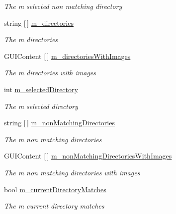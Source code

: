 \begin{DoxyCompactItemize}
\begin{DoxyCompactList}\small\item\em The m selected non matching directory \end{DoxyCompactList}\item 
string \mbox{[}$\,$\mbox{]} \hyperlink{class_lerp2_a_p_i_editor_1_1_utility_1_1_file_browser_editor_a5112a37291c548fa86b7d014d2ac63b5}{m\+\_\+directories}
\begin{DoxyCompactList}\small\item\em The m directories \end{DoxyCompactList}\item 
G\+U\+I\+Content \mbox{[}$\,$\mbox{]} \hyperlink{class_lerp2_a_p_i_editor_1_1_utility_1_1_file_browser_editor_ad2e4a8d4c9a1e00807d61087f2eb5858}{m\+\_\+directories\+With\+Images}
\begin{DoxyCompactList}\small\item\em The m directories with images \end{DoxyCompactList}\item 
int \hyperlink{class_lerp2_a_p_i_editor_1_1_utility_1_1_file_browser_editor_aec240731194c3291c444d85b9fd01f3d}{m\+\_\+selected\+Directory}
\begin{DoxyCompactList}\small\item\em The m selected directory \end{DoxyCompactList}\item 
string \mbox{[}$\,$\mbox{]} \hyperlink{class_lerp2_a_p_i_editor_1_1_utility_1_1_file_browser_editor_ae6a311178a8deeeabfbba84f0dd22e99}{m\+\_\+non\+Matching\+Directories}
\begin{DoxyCompactList}\small\item\em The m non matching directories \end{DoxyCompactList}\item 
G\+U\+I\+Content \mbox{[}$\,$\mbox{]} \hyperlink{class_lerp2_a_p_i_editor_1_1_utility_1_1_file_browser_editor_ab9929887fe099addb00c6f987d92e232}{m\+\_\+non\+Matching\+Directories\+With\+Images}
\begin{DoxyCompactList}\small\item\em The m non matching directories with images \end{DoxyCompactList}\item 
bool \hyperlink{class_lerp2_a_p_i_editor_1_1_utility_1_1_file_browser_editor_a2ae4d2b115e4b9e4f64ed620a7986dc7}{m\+\_\+current\+Directory\+Matches}
\begin{DoxyCompactList}\small\item\em The m current directory matches \end{DoxyCompactList}\item 

\end{DoxyCompactItemize}
